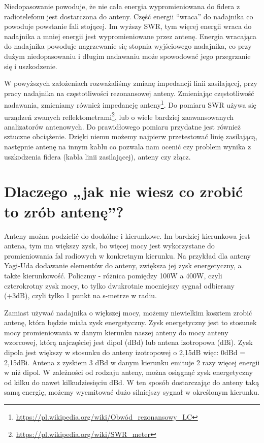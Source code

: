 \documentclass[a4paper,12pt]{article}
\begin{document}
Niedopasowanie powoduje, że nie cała energia wypromieniowana do fidera z radiotelefonu jest dostarczona do anteny. Część energii “wraca” do nadajnika co powoduje powstanie fali stojącej. Im wyższy SWR, tym więcej energii wraca do nadajnika a mniej energii jest wypromieniowane przez antenę. Energia wracająca do nadajnika powoduje nagrzewanie się stopnia wyjściowego nadajnika, co przy dużym niedopasowaniu i długim nadawaniu może spowodować jego przegrzanie się i uszkodzenie.

W powyższych założeniach rozważaliśmy zmianę impedancji linii zasilającej, przy pracy nadajnika na częstotliwości rezonansowej anteny. Zmieniając częstotliwość nadawania, zmieniamy również impedancję anteny\footnote{\url{https://pl.wikipedia.org/wiki/Obwód_rezonansowy_LC}}.
Do pomiaru SWR używa się urządzeń zwanych reflektometrami\footnote{\url{https://pl.wikipedia.org/wiki/SWR_meter}}, lub o wiele bardziej zaawansowanych analizatorów antenowych.
Do prawidłowego pomiaru przydatne jest również sztuczne obciążenie. Dzięki niemu możemy najpierw przetestować linię zasilającą, następnie antenę na innym kablu co pozwala nam ocenić czy problem wynika z uszkodzenia fidera (kabla linii zasilającej), anteny czy złącz.

\section{Dlaczego „jak nie wiesz co zrobić to zrób antenę”?}
Anteny można podzielić do dookólne i kierunkowe. Im bardziej kierunkowa jest antena, tym ma większy zysk, bo więcej mocy jest wykorzystane do promieniowania fal radiowych w konkretnym kierunku. Na przykład dla anteny Yagi-Uda dodawanie elementów do anteny, zwiększa jej zysk energetyczny, a także kierunkowość.
Policzmy - różnica pomiędzy 100W a 400W, czyli czterokrotny zysk mocy, to tylko dwukrotnie mocniejszy sygnał odbierany (+3dB), czyli tylko 1 punkt na s-metrze w radiu. 

Zamiast używać nadajnika o większej mocy, możemy niewielkim kosztem zrobić antenę, która będzie miała zysk energetyczny. Zysk energetyczny jest to stosunek mocy promieniowania w danym kierunku naszej anteny do mocy anteny wzorcowej, którą najczęściej jest dipol (dBd) lub antena izotropowa (dBi). Zysk dipola jest większy w stosunku do anteny izotropowej o 2,15dB więc: 0dBd = 2,15dBi. Antena z zyskiem 3 dBd w danym kierunku emituje 2 razy więcej energii w niż dipol. W zależności od rodzaju anteny, można osiągnąć zysk energetyczny od kilku do nawet kilkudziesięciu dBd. W ten sposób dostarczając do anteny taką samą energię, możemy wyemitować dużo silniejszy sygnał w określonym kierunku.
\end{document}
